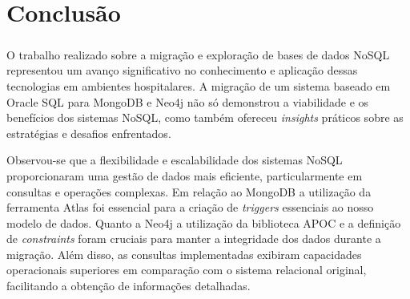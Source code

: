 \chapter{Conclusão}
\paragraph{}




O trabalho realizado sobre a migração e exploração de bases de dados NoSQL representou um avanço significativo no conhecimento e aplicação dessas tecnologias em ambientes hospitalares. A migração de um sistema baseado em Oracle SQL para MongoDB e Neo4j não só demonstrou a viabilidade e os benefícios dos sistemas NoSQL, como também ofereceu \textit{insights} práticos sobre as estratégias e desafios enfrentados.

Observou-se que a flexibilidade e escalabilidade dos sistemas NoSQL proporcionaram uma gestão de dados mais eficiente, particularmente em consultas e operações complexas. Em relação ao MongoDB a utilização da ferramenta Atlas foi essencial para a criação de \textit{triggers} essenciais ao nosso modelo de dados. Quanto a Neo4j a utilização da biblioteca APOC e a definição de \textit{constraints} foram cruciais para manter a integridade dos dados durante a migração. Além disso, as consultas implementadas exibiram capacidades operacionais superiores em comparação com o sistema relacional original, facilitando a obtenção de informações detalhadas.


